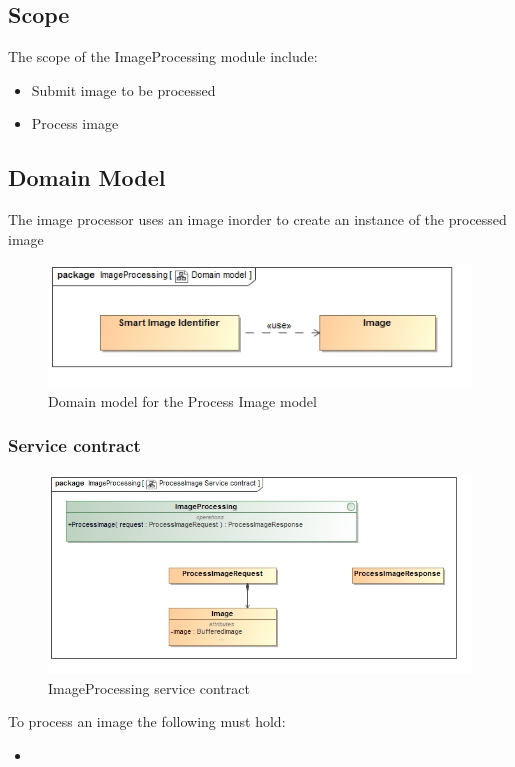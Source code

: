 \documentclass[a4paper,12pt]{report}
\begin{document}
	\subsection {Scope}
		The scope of the ImageProcessing module include:
			\begin {itemize}
				\item Submit image to be processed
				\item Process image
			\end {itemize}

	\FloatBarrier
	\subsection {Domain Model}
		The image processor uses an image inorder to create an instance of the processed image
		\begin{figure}[htb]
			\centering
			\includegraphics [scale=0.5]{../Diagrams/ProcessImage_Domain_model.jpg}
			\caption{Domain model for the Process Image model}
		\end{figure}	

		\FloatBarrier
		\subsubsection {Service contract}
			\begin{figure}[htb]
				\centering
				\includegraphics [scale=0.5]{../Diagrams/ProcessImage_Service_contract.jpg}
				\caption{ImageProcessing service contract}
			\end{figure}	
			To process an image the following must hold:
			\begin {itemize}
				\item 
			\end {itemize}
\end{document}
